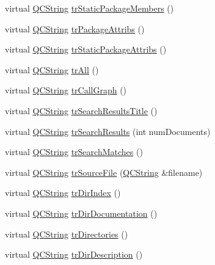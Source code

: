 \begin{DoxyCompactItemize}
\item 
virtual \hyperlink{class_q_c_string}{Q\+C\+String} \hyperlink{class_translator_arabic_a9196ff5e4aec8c51f04d2ab7ce81b911}{tr\+Static\+Package\+Members} ()
\item 
virtual \hyperlink{class_q_c_string}{Q\+C\+String} \hyperlink{class_translator_arabic_a3fb7e1777720ff1ab10aaeee75dd2a2a}{tr\+Package\+Attribs} ()
\item 
virtual \hyperlink{class_q_c_string}{Q\+C\+String} \hyperlink{class_translator_arabic_ae21911cb6b577cae069bdb9a402b8513}{tr\+Static\+Package\+Attribs} ()
\item 
virtual \hyperlink{class_q_c_string}{Q\+C\+String} \hyperlink{class_translator_arabic_ab25ba70bda04768d6c1a31414567f973}{tr\+All} ()
\item 
virtual \hyperlink{class_q_c_string}{Q\+C\+String} \hyperlink{class_translator_arabic_a653f65a872ca15cf8b8cc117819f6ba1}{tr\+Call\+Graph} ()
\item 
virtual \hyperlink{class_q_c_string}{Q\+C\+String} \hyperlink{class_translator_arabic_a375288f06fd49370b8b1c04af4a759c5}{tr\+Search\+Results\+Title} ()
\item 
virtual \hyperlink{class_q_c_string}{Q\+C\+String} \hyperlink{class_translator_arabic_adf073ad76dbfbcad593352948d763937}{tr\+Search\+Results} (int num\+Documents)
\item 
virtual \hyperlink{class_q_c_string}{Q\+C\+String} \hyperlink{class_translator_arabic_ad66d22bab94edf3ea99999c5348e8ab0}{tr\+Search\+Matches} ()
\item 
virtual \hyperlink{class_q_c_string}{Q\+C\+String} \hyperlink{class_translator_arabic_ae231bc0da0b0a5c1cfba86363bcbf444}{tr\+Source\+File} (\hyperlink{class_q_c_string}{Q\+C\+String} \&filename)
\item 
virtual \hyperlink{class_q_c_string}{Q\+C\+String} \hyperlink{class_translator_arabic_a2ef6949ec9de4479e48b911a97821b94}{tr\+Dir\+Index} ()
\item 
virtual \hyperlink{class_q_c_string}{Q\+C\+String} \hyperlink{class_translator_arabic_a42bc84de896868f2309af1cb41abfbaf}{tr\+Dir\+Documentation} ()
\item 
virtual \hyperlink{class_q_c_string}{Q\+C\+String} \hyperlink{class_translator_arabic_a3540585a951e0159a6a4c30266e12db2}{tr\+Directories} ()
\item 
virtual \hyperlink{class_q_c_string}{Q\+C\+String} \hyperlink{class_translator_arabic_a6e5949ba70cda34290d8fb987ff1e4c9}{tr\+Dir\+Description} ()
\item 

\end{DoxyCompactItemize}
